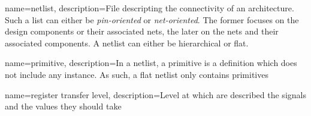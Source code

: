 {
	name=netlist,
	description={File descripting the connectivity of an architecture.
				Such a list can either be \textit{pin-oriented} or \textit{net-oriented}.
				The former focuses on the design components or their associated nets, the later on the nets and their associated components.
				\newline
				A netlist can either be hierarchical or flat.}
}

{
	name=primitive,
	description={In a netlist, a primitive is a definition which does not include any instance.
				As such, a flat netlist only contains primitives}
}


{
	name=register transfer level,
	description={Level at which are described the signals and the values they should take}
}

